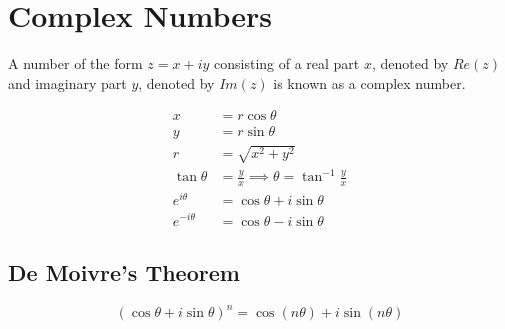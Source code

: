 \section{Complex Numbers}
A number of the form \(z = x + iy \) consisting of a real part \(x\), denoted by \( Re(z) \) and imaginary part \(y\), denoted by \( Im(z) \) is known as a complex number.

\begin{align}
x &= r\cos\theta \\
y &= r\sin\theta \\
r &= \sqrt{x^2 + y^2} \\
\tan\theta &= \frac{y}{x} \implies \theta = \tan^{-1}{\frac{y}{x}} \\
e^{i\theta} &= \cos\theta + i\sin\theta \\
e^{-i\theta} &= \cos\theta - i\sin\theta
\end{align}

\subsection{\textbf{De Moivre's Theorem}}
\begin{equation}
\label{demovire}
(\cos\theta + i\sin\theta)^{n} = \cos(n\theta) + i\sin(n\theta)
\end{equation}

